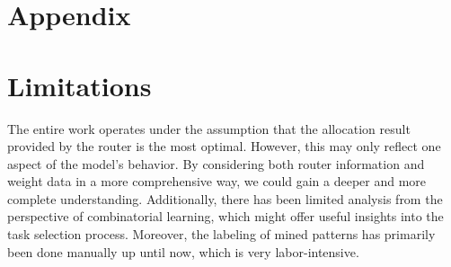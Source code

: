 \documentclass[11pt]{article}
\begin{document}
\newpage




\newpage

\appendix
\section*{Appendix} 
\section{Limitations}
The entire work operates under the assumption that the allocation result provided by the router is the most optimal. However, this may only reflect one aspect of the model's behavior. By considering both router information and weight data in a more comprehensive way, we could gain a deeper and more complete understanding. Additionally, there has been limited analysis from the perspective of combinatorial learning, which might offer useful insights into the task selection process. Moreover, the labeling of mined patterns has primarily been done manually up until now, which is very labor-intensive.

\end{document}
